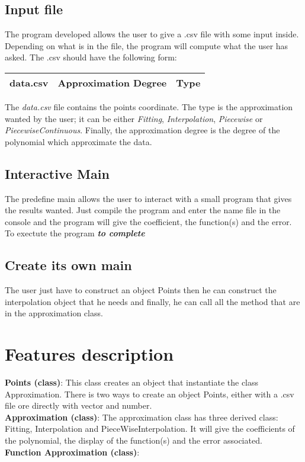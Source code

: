 \documentclass[12pt]{article}
\begin{document}
\subsection{Input file}
The program developed allows the user to give a .csv file with some input inside. Depending on what is in the file, the program will compute what the user has asked. The .csv should have the following form:\\
\begin{center}
\begin{tabular}{|c|c|c|}
\hline
data.csv & Approximation Degree & Type  \\
\hline
\end{tabular} 
\end{center}
The \emph{data.csv} file contains the points coordinate. The type is the approximation wanted by the user; it can be either \emph{Fitting}, \emph{Interpolation}, \emph{Piecewise} or \emph{PiecewiseContinuous}. Finally, the approximation degree  is the degree of the polynomial which approximate the data.\\

\subsection{Interactive Main}
The predefine main allows the user to interact with a small program that gives the results wanted. Just compile the program and enter the name file in the console and the program will give the coefficient, the function(s) and the error.
To exectute the program \textbf{\emph{to complete}}

\subsection{Create its own main}
The user just have to construct an object Points then he can construct the interpolation object that he needs and finally, he can call all the method that are in the approximation class.

\section{Features description}
\textbf{Points (class)}: This class creates an object that instantiate the class Approximation. There is two ways to create an object Points, either with a .csv file ore directly with vector and number.\\
\textbf{Approximation (class)}: The approximation class has three derived class: Fitting, Interpolation and PieceWiseInterpolation. It will give the coefficients of the polynomial, the display of the function(s) and the error associated.\\
\textbf{Function Approximation (class)}:
\end{document}
